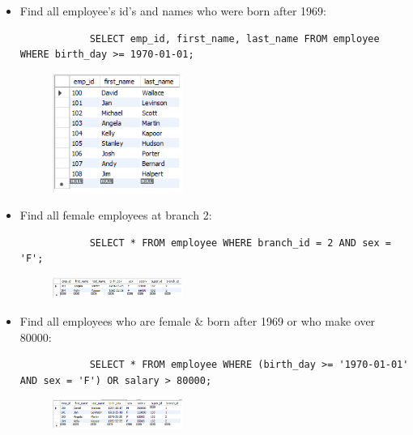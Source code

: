 \begin{itemize}
    \item Find all employee's id's and names who were born after 1969:
        \begin{verbatim}
            SELECT emp_id, first_name, last_name FROM employee WHERE birth_day >= 1970-01-01;
        \end{verbatim}
        \begin{figure}[H]
            \centering
            \includegraphics[width=0.4\textwidth]{./Figs/2020-12-24-20-48-48.png}
        \end{figure}
    
    \item Find all female employees at branch 2:
        \begin{verbatim}
            SELECT * FROM employee WHERE branch_id = 2 AND sex = 'F';
        \end{verbatim}
        \begin{figure}[H]
            \centering
            \includegraphics[width=0.4\textwidth]{./Figs/2020-12-24-20-49-50.png}
        \end{figure}
    
    \item Find all employees who are female  \& born after 1969 or who make over 80000:
        \begin{verbatim}
            SELECT * FROM employee WHERE (birth_day >= '1970-01-01' AND sex = 'F') OR salary > 80000;
        \end{verbatim}
        \begin{figure}[H]
            \centering
            \includegraphics[width=0.4\textwidth]{./Figs/2020-12-24-20-50-39.png}
        \end{figure}
    

\end{itemize}
